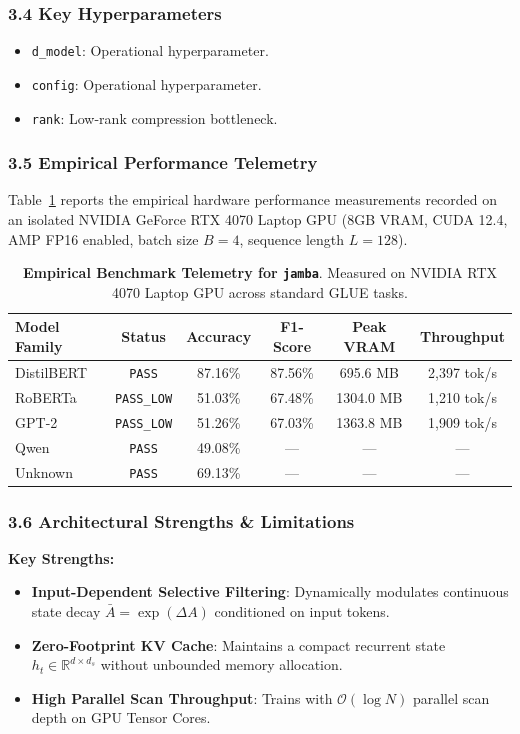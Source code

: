 \subsubsection*{3.4 Key Hyperparameters}
\begin{itemize}
    \item \texttt{d\_model}: Operational hyperparameter.
    \item \texttt{config}: Operational hyperparameter.
    \item \texttt{rank}: Low-rank compression bottleneck.
\end{itemize}

\subsubsection*{3.5 Empirical Performance Telemetry}
Table~\ref{tab:telemetry_jamba} reports the empirical hardware performance measurements recorded on an isolated NVIDIA GeForce RTX 4070 Laptop GPU (8GB VRAM, CUDA 12.4, AMP FP16 enabled, batch size $B=4$, sequence length $L=128$).

\begin{table}[h]
\centering
\small
\caption{\textbf{Empirical Benchmark Telemetry for \texttt{jamba}}. Measured on NVIDIA RTX 4070 Laptop GPU across standard GLUE tasks.}
\label{tab:telemetry_jamba}
\begin{tabular*}{\columnwidth}{@{\extracolsep{\fill}}lccccc}
\toprule
\textbf{Model Family} & \textbf{Status} & \textbf{Accuracy} & \textbf{F1-Score} & \textbf{Peak VRAM} & \textbf{Throughput} \\
\midrule
DistilBERT & \texttt{PASS} & 87.16\% & 87.56\% & 695.6 MB & 2,397 tok/s \\
RoBERTa & \texttt{PASS\_LOW} & 51.03\% & 67.48\% & 1304.0 MB & 1,210 tok/s \\
GPT-2 & \texttt{PASS\_LOW} & 51.26\% & 67.03\% & 1363.8 MB & 1,909 tok/s \\
Qwen & \texttt{PASS} & 49.08\% & --- & --- & --- \\
Unknown & \texttt{PASS} & 69.13\% & --- & --- & --- \\
\bottomrule
\end{tabular*}
\end{table}

\subsubsection*{3.6 Architectural Strengths \& Limitations}
\textbf{Key Strengths:}
\begin{itemize}
    \item \textbf{Input-Dependent Selective Filtering}: Dynamically modulates continuous state decay $\bar{A} = \exp(\Delta A)$ conditioned on input tokens.
    \item \textbf{Zero-Footprint KV Cache}: Maintains a compact recurrent state $h_t \in \mathbb{R}^{d \times d_s}$ without unbounded memory allocation.
    \item \textbf{High Parallel Scan Throughput}: Trains with $\mathcal{O}(\log N)$ parallel scan depth on GPU Tensor Cores.
\end{itemize}

